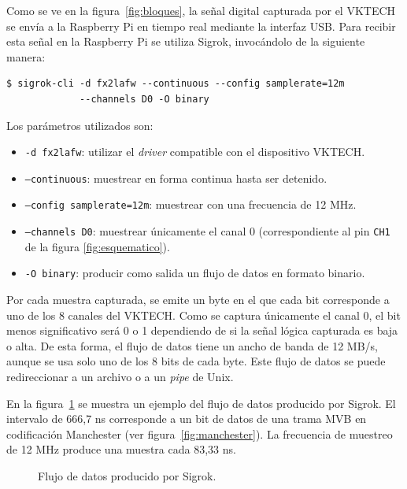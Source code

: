 Como se ve en la figura~\ref{fig:bloques}, la señal digital capturada por el VKTECH se envía a la Raspberry Pi en tiempo real mediante la interfaz USB. Para recibir esta señal en la Raspberry Pi se utiliza Sigrok, invocándolo de la siguiente manera:

\begin{lstlisting}
$ sigrok-cli -d fx2lafw --continuous --config samplerate=12m
             --channels D0 -O binary
\end{lstlisting}

Los parámetros utilizados son:

\begin{itemize}
    \item \texttt{-d fx2lafw}: utilizar el \textit{driver} compatible con el dispositivo VKTECH.
    \item \texttt{--continuous}: muestrear en forma continua hasta ser detenido.
    \item \texttt{--config samplerate=12m}: muestrear con una frecuencia de 12 MHz.
    \item \texttt{--channels D0}: muestrear únicamente el canal 0 (correspondiente al pin \texttt{CH1} de la figura \ref{fig:esquematico}).
    \item \texttt{-O binary}: producir como salida un flujo de datos en formato binario.
\end{itemize}

Por cada muestra capturada, se emite un byte en el que cada bit corresponde a uno de los 8 canales del VKTECH.
Como se captura únicamente el canal 0, el bit menos significativo será 0 o 1 dependiendo de si la señal lógica capturada es baja o alta.
De esta forma, el flujo de datos tiene un ancho de banda de 12 MB/s, aunque se usa solo uno de los 8 bits de cada byte.
Este flujo de datos se puede redireccionar a un archivo o a un \textit{pipe} de Unix.

En la figura~\ref{fig:sigrok} se muestra un ejemplo del flujo de datos producido por Sigrok. El intervalo de 666,7 ns corresponde a un bit de datos de una trama MVB en codificación Manchester (ver figura~\ref{fig:manchester}). La frecuencia de muestreo de 12 MHz produce una muestra cada 83,33 ns.

\begin{figure}[htbp]
	\centering
    {
        \fontsize{9pt}{9pt}\selectfont
        
    }
	\caption{Flujo de datos producido por Sigrok.}
    \label{fig:sigrok}
\end{figure}

